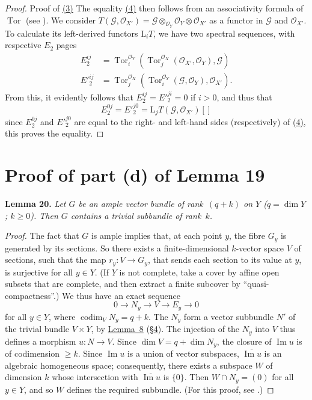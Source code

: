 \documentclass{article}
\newenvironment{itenv}[1]
  {\phantomsection\par\medskip\noindent\textbf{#1.}\itshape}
  {\par\medskip}
\newcommand{\scr}[1]{{\mathscr{#1}}}
\newcommand{\LL}{\mathrm{L}}
\renewcommand{\geq}{\geqslant}
\DeclareMathOperator{\Tor}{Tor}
\DeclareMathOperator{\codim}{codim}
\newcommand{\oldpage}[1]{\marginpar{\footnotesize$\Big\vert$ \textit{p.~#1}}}
\begin{document}
\begin{proof}{Proof of {\hyperref[section15equation3]{(3)}}}
  The equality \hyperref[section15equation4]{(4)} then follows from an associativity formula of $\Tor$ (see \cite[p.~345]{3}).
  We consider $T(\scr{G},\scr{O}_{X'}) = \scr{G}\otimes_{\scr{O}_Y}\scr{O}_Y\otimes\scr{O}_{X'}$ as a functor in $\scr{G}$ and $\scr{O}_{X'}$.
  To calculate its left-derived functors $\LL_iT$, we have two spectral sequences, with respective $E_2$ pages
  \begin{align*}
    E_2^{ij} &= \Tor_i^{\scr{O}_Y}(\Tor_j^{\scr{O}_X}(\scr{O}_{X'},\scr{O}_Y),\scr{G})
  \\E'^{ij}_2 &= \Tor_j^{\scr{O}_X}(\Tor_i^{\scr{O}_Y}(\scr{G},\scr{O}_Y),\scr{O}_{X'}).
  \end{align*}
  From this, it evidently follows that $E_2^{ij}=E'^{ji}_2=0$ if $i>0$, and thus that
  \[
    E_2^{0j} = E'^{j0}_2 = \LL_jT(\scr{G},\scr{O}_{X'})[]
  \]
  since $E_2^{0j}$ and $E'^{j0}_2$ are equal to the right- and left-hand sides (respectively) of \hyperref[section15equation4]{(4)}, this proves the equality.
\end{proof}


\section{Proof of part (d) of Lemma 19}
\label{section16}

\begin{itenv}{Lemma 20}
\label{lemma20}
  Let $G$ be an ample vector bundle of rank~$(q+k)$ on $Y$ ($q=\dim Y$; $k\geq0$).
  Then $G$ contains a trivial subbundle of rank~$k$.
\end{itenv}

\begin{proof}
  The fact that $G$ is ample implies that, at each point $y$, the fibre $G_y$ is generated by its sections.
  So there exists a finite-dimensional $k$-vector space $V$ of sections, such that the map $r_y\colon V\to G_y$, that sends each section to its value at $y$, is surjective for all $y\in Y$.
  (If $Y$ is not complete, take a cover by affine open subsets that are complete, and then extract a finite subcover by ``quasi-compactness''.)
  We thus have an exact sequence
  \[
    0 \to N_y \to V \to E_y \to 0
  \]
\oldpage{133}
  for all $y\in Y$, where $\codim_V N_y=q+k$.
  The $N_y$ form a vector subbundle $N'$ of the trivial bundle $V\times Y$, by \hyperref[lemma8]{Lemma~8} (\hyperref[section4]{\S4}).
  The injection of the $N_y$ into $V$ thus defines a morphism $u\colon N\to V$.
  Since $\dim V=q+\dim N_y$, the closure of $\operatorname{Im}u$ is of codimension $\geq k$.
  Since $\operatorname{Im}u$ is a union of vector subspaces, $\overline{\operatorname{Im}u}$ is an algebraic homogeneous space;
  consequently, there exists a subspace $W$ of dimension $k$ whose intersection with $\overline{\operatorname{Im}u}$ is $\{0\}$.
  Then $W\cap N_y=(0)$ for all $y\in Y$, and so $W$ defines the required subbundle.
  (For this proof, see \cite{1}.)
\end{proof}
\end{document}
